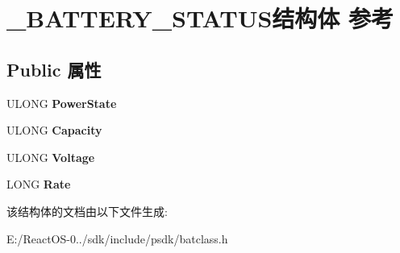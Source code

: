 \hypertarget{struct___b_a_t_t_e_r_y___s_t_a_t_u_s}{}\section{\+\_\+\+B\+A\+T\+T\+E\+R\+Y\+\_\+\+S\+T\+A\+T\+U\+S结构体 参考}
\label{struct___b_a_t_t_e_r_y___s_t_a_t_u_s}
\subsection*{Public 属性}
\begin{DoxyCompactItemize}
\item 
\mbox{\label{struct___b_a_t_t_e_r_y___s_t_a_t_u_s_a9945e4d2531d42e38cd34361532c7465}} 
U\+L\+O\+NG {\bfseries Power\+State}
\item 
\mbox{\label{struct___b_a_t_t_e_r_y___s_t_a_t_u_s_ada88e92057129b515564e8e750e230c7}} 
U\+L\+O\+NG {\bfseries Capacity}
\item 
\mbox{\label{struct___b_a_t_t_e_r_y___s_t_a_t_u_s_a105cf1bddf99f8d1b7cd30637b33a624}} 
U\+L\+O\+NG {\bfseries Voltage}
\item 
\mbox{\label{struct___b_a_t_t_e_r_y___s_t_a_t_u_s_a5743ea98edd495bc935939cb9a3e45e6}} 
L\+O\+NG {\bfseries Rate}
\end{DoxyCompactItemize}


该结构体的文档由以下文件生成\+:\begin{DoxyCompactItemize}
\item 
E\+:/\+React\+O\+S-\/0../sdk/include/psdk/batclass.\+h\end{DoxyCompactItemize}
